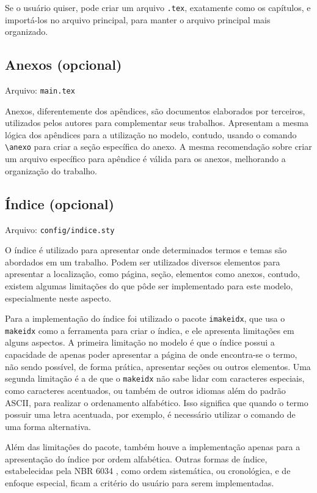    Se o usuário quiser, pode criar um arquivo \texttt{.tex}, exatamente como os capítulos, e importá-los no arquivo principal, para manter o arquivo principal mais organizado.

\subsection{Anexos (opcional)}
    Arquivo: \texttt{main.tex}
    
    Anexos, diferentemente dos apêndices, são documentos elaborados por terceiros, utilizados pelos autores para complementar seus trabalhos. Apresentam a mesma lógica dos apêndices para a utilização no modelo, contudo, usando o comando \verb|\anexo| para criar a seção específica do anexo. A mesma recomendação sobre criar um arquivo específico para apêndice é válida para os anexos, melhorando a organização do trabalho.

\subsection{Índice (opcional)}
    Arquivo: \texttt{config/indice.sty}

    O índice é utilizado para apresentar onde determinados termos e temas são abordados em um trabalho. Podem ser utilizados diversos elementos para apresentar a localização, como página, seção, elementos como anexos, contudo, existem algumas limitações do que pôde ser implementado para este modelo, especialmente neste aspecto.
    
    Para a implementação do índice foi utilizado o pacote \texttt{imakeidx}, que usa o \texttt{makeidx} como a ferramenta para criar o índica, e ele apresenta limitações em alguns aspectos. A primeira limitação no modelo é que o índice possui a capacidade de apenas poder apresentar a página de onde encontra-se o termo, não sendo possível, de forma prática, apresentar seções ou outros elementos. Uma segunda limitação é a de que o \texttt{makeidx} não sabe lidar com caracteres especiais, como caracteres acentuados, ou também de outros idiomas além do padrão ASCII, para realizar o ordenamento alfabético. Isso significa que quando o termo possuir uma letra acentuada, por exemplo, é necessário utilizar o comando de uma forma alternativa.
    
    Além das limitações do pacote, também houve a implementação apenas para a apresentação do índice por ordem alfabética. Outras formas de índice, estabelecidas pela NBR 6034 \cite{livro:abnt-nbr6034:2004}, como ordem sistemática, ou cronológica, e de enfoque especial, ficam a critério do usuário para serem implementadas.

